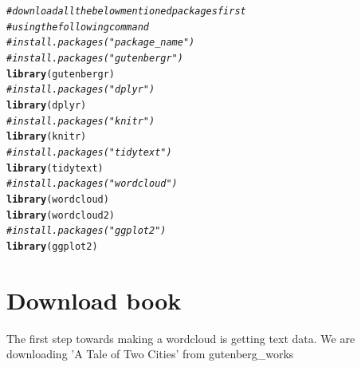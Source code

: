 \documentclass[12pt, letterpaper, twoside]{article}\usepackage[]{graphicx}\usepackage[]{color}
\makeatletter
\newcommand{\hlcom}[1]{\textcolor[rgb]{0.678,0.584,0.686}{\textit{#1}}}%
\newcommand{\hlstd}[1]{\textcolor[rgb]{0.345,0.345,0.345}{#1}}%
\newcommand{\hlkwd}[1]{\textcolor[rgb]{0.737,0.353,0.396}{\textbf{#1}}}%
\newenvironment{kframe}{%
 \def\at@end@of@kframe{}%
 \ifinner\ifhmode%
  \def\at@end@of@kframe{\end{minipage}}%
  \begin{minipage}{\columnwidth}%
 \fi\fi%
 \def\FrameCommand##1{\hskip\@totalleftmargin \hskip-\fboxsep
 \colorbox{shadecolor}{##1}\hskip-\fboxsep
     \hskip-\linewidth \hskip-\@totalleftmargin \hskip\columnwidth}%
 \MakeFramed {\advance\hsize-\width
   \@totalleftmargin\z@ \linewidth\hsize
   \@setminipage}}%
 {\par\unskip\endMakeFramed%
 \at@end@of@kframe}
\newenvironment{knitrout}{}{} %
\makeatother
\begin{document}
\begin{knitrout}
\color{fgcolor}\begin{kframe}
\begin{alltt}
\hlcom{# download all the below mentioned packages first }
\hlcom{#using the following command }
\hlcom{#install.packages("package_name")}
\hlcom{# install.packages("gutenbergr")}
\hlkwd{library}\hlstd{(gutenbergr)}
\hlcom{# install.packages("dplyr")}
\hlkwd{library}\hlstd{(dplyr)}
\hlcom{# install.packages("knitr")}
\hlkwd{library}\hlstd{(knitr)}
\hlcom{# install.packages("tidytext")}
\hlkwd{library}\hlstd{(tidytext)}
\hlcom{# install.packages("wordcloud")}
\hlkwd{library}\hlstd{(wordcloud)}
\hlkwd{library}\hlstd{(wordcloud2)}
\hlcom{# install.packages("ggplot2")}
\hlkwd{library}\hlstd{(ggplot2)}
\end{alltt}
\end{kframe}
\end{knitrout}

\section{Download book}
\noindent The first step towards making a wordcloud is getting text data. We are downloading 'A Tale of Two Cities' from gutenberg\_works
\end{document}
